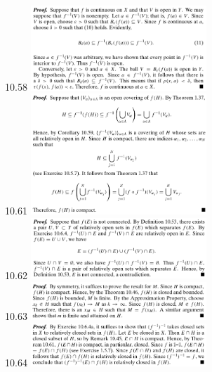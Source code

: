 \documentclass[8pt,landscape]{article}
\begin{document}
\begin{multicols}{3}
    10.58
    \includegraphics[width=250]{10_58.png} \\
    10.61
    \includegraphics[width=250]{10_61.png} \\
    10.62
    \includegraphics[width=250]{10_62.png} \\
    10.63
    \includegraphics[width=250]{10_63.png} \\
    10.64
    \includegraphics[width=250]{10_64.png} \\
\end{multicols}
\end{document}
